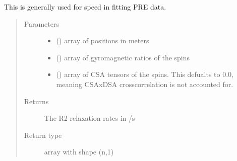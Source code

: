 \documentclass[a4paper,10pt,english,openany,oneside]{sphinxmanual}
\begin{document}
\begin{fulllineitems}
\begin{fulllineitems}
\begin{fulllineitems}
\sphinxAtStartPar
This is generally used for speed in fitting PRE data.
\begin{quote}\begin{description}
\item[{Parameters}] \leavevmode\begin{itemize}
\item {} 
\sphinxAtStartPar
{} (\sphinxstyleliteralemphasis{\sphinxupquote{ (}}\sphinxstyleliteralemphasis{\sphinxupquote{,}}\sphinxstyleliteralemphasis{\sphinxupquote{)}}) \textendash{} array of positions in meters

\item {} 
\sphinxAtStartPar
{} (\sphinxstyleliteralemphasis{\sphinxupquote{ (}}\sphinxstyleliteralemphasis{\sphinxupquote{,}}\sphinxstyleliteralemphasis{\sphinxupquote{)}}) \textendash{} array of gyromagnetic ratios of the spins

\item {} 
\sphinxAtStartPar
{} (\sphinxstyleliteralemphasis{\sphinxupquote{ (}}\sphinxstyleliteralemphasis{\sphinxupquote{,}}\sphinxstyleliteralemphasis{\sphinxupquote{,}}\sphinxstyleliteralemphasis{\sphinxupquote{) }}\sphinxstyleliteralemphasis{\sphinxupquote{(}}\sphinxstyleliteralemphasis{\sphinxupquote{)}}) \textendash{} array of CSA tensors of the spins.
This defualts to 0.0, meaning CSAxDSA crosscorrelation is
not accounted for.

\end{itemize}

\item[{Returns}] \leavevmode
\sphinxAtStartPar
{} \textendash{} The R2 relaxation rates in /s

\item[{Return type}] \leavevmode
\sphinxAtStartPar
array with shape (n,1)

\end{description}\end{quote}


\end{fulllineitems}
\end{fulllineitems}
\end{fulllineitems}
\end{document}
